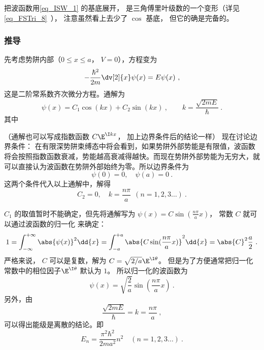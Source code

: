 把波函数用\autoref{eq_ISW_1} 的基底展开， 是三角傅里叶级数的一个变形（详见\autoref{eq_FSTri_8}~）， 注意虽然看上去少了 $\cos$ 基底， 但它的确是完备的。


\subsubsection{推导} 
先考虑势阱内部（$0 \leqslant x \leqslant a$， $V = 0$），方程变为
\begin{equation}
-\frac{\hbar^2}{2m} \dv[2]{x} \psi(x) = E\psi(x) ~,
\end{equation}
这是二阶常系数齐次微分方程。通解为
\begin{equation}
\psi(x) = C_1\cos(kx) + C_2 \sin(kx)~, \qquad
k = \frac{\sqrt{2mE}}{\hbar}~.
\end{equation} 
其中

（通解也可以写成指数函数 $C\E^{\I kx}$， 加上边界条件后的结论一样）
现在讨论边界条件： 在有限深势阱束缚态中将会看到，如果势阱外部势能是有限值，波函数将会按照指数函数衰减，势能越高衰减得越快。而现在势阱外部势能为无穷大，就可以直接认为波函数在势阱外部始终为零。所以边界条件为
\begin{equation}
\psi(0) = 0, \quad \psi(a) = 0~.
\end{equation}
这两个条件代入以上通解中，解得
\begin{equation}
C_2 = 0, \quad k = \frac{n\pi}{a}  \ \ (n = 1,2,3\dots)~.
\end{equation}

$C_1$ 的取值暂时不能确定，但先将通解写为 $\psi(x) = C\sin(\frac{n\pi }{a}x)$， 常数 $C$ 就可以通过波函数的归一化%
来确定：
\begin{equation}
1 = \int_{-\infty }^{+\infty } \abs{\psi(x)}^2 \dd{x}  = \int_{-a}^{+a} \abs{C\sin(\frac{n\pi }{a} x)}^2 \dd{x}  = \abs{C}^2 \frac{a}{2}~.
\end{equation}
严格来说， $C$ 可以是复数，解为 $C = \sqrt{2/a} \E^{\I\theta}$。 但是为了方便通常把归一化常数中的相位因子$\E^{\I\theta}$ 默认为 $1$。 所以归一化的波函数为
\begin{equation}
\psi(x) = \sqrt{\frac{2}{a}} \sin(\frac{n\pi }{a}x)~.
\end{equation}
另外，由
\begin{equation}
\frac{\sqrt{2mE}}{\hbar} = k = \frac{n\pi }{a}~,
\end{equation}
可以得出能级是离散的结论。即
\begin{equation}
E_n = \frac{\pi^2\hbar^2}{2m a^2} n^2 \quad (n = 1,2,3\dots)~.
\end{equation}
